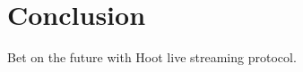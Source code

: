 \documentclass{article}
\begin{document}
\section{Conclusion}
Bet on the future with Hoot live streaming protocol.

\newpage





\end{document}
